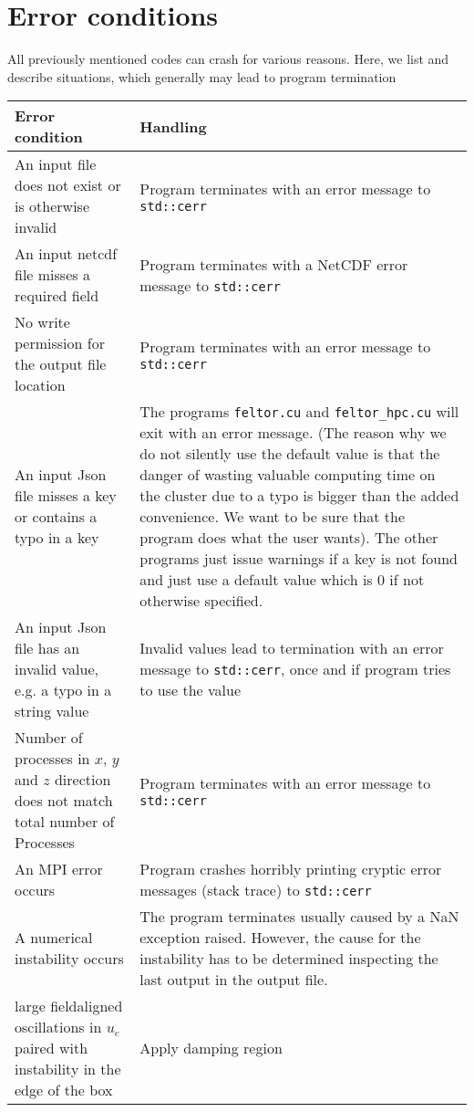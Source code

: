 \section{Error conditions}
All previously mentioned codes can crash for various reasons. Here,
we list and describe situations, which generally may lead to program
termination
\begin{longtable}{p{6cm}p{8cm}}
\toprule
\rowcolor{gray!50}\textbf{Error condition} &  \textbf{Handling} \\ \midrule
An input file does not exist or is otherwise invalid
&
Program terminates with an error message to \texttt{std::cerr}
    \\
An input netcdf file misses a required field
&
Program terminates with a NetCDF error message to \texttt{std::cerr}
    \\
No write permission for the output file location
&
Program terminates with an error message to \texttt{std::cerr}
    \\
An input Json file misses a key or contains a typo in a key
&
The programs \texttt{feltor.cu} and \texttt{feltor\_hpc.cu}
will exit with an error message. (The reason why we do not
silently use the default value is that the danger of wasting
valuable computing time on the cluster due to a typo is bigger than the
added convenience. We want to be sure that the program
does what the user wants).
The other programs just issue warnings
if a key is not found and just use a default value
which is $0$ if not otherwise specified.
    \\
    An input Json file has an invalid value, e.g. a typo in a string value
&
Invalid values lead to termination with an error message to \texttt{std::cerr}, once and if program tries to use the value
    \\
Number of processes in $x$, $y$ and $z$ direction does not match total number of Processes
&
Program terminates with an error message to \texttt{std::cerr}
    \\
An MPI error occurs
&
Program crashes horribly printing cryptic error messages (stack trace) to \texttt{std::cerr}
    \\
A numerical instability occurs
&
The program terminates usually caused by a NaN exception raised. However,
the cause for the instability has to be determined inspecting the
last output in the output file.
    \\
\qquad large fieldaligned oscillations in $u_e$ paired with instability in the edge of the box
&
Apply damping region
    \\

\end{longtable}
